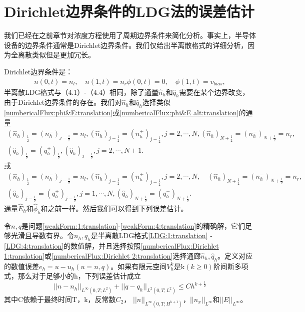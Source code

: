 \section{Dirichlet边界条件的LDG法的误差估计}
我们已经在之前章节对浓度方程使用了周期边界条件来简化分析。事实上，半导体设备的边界条件通常是Dirichlet边界条件。我们仅给出半离散格式的详细分析，因为全离散类似但是更加冗长。

Dirichlet边界条件是：
\begin{align}
    n(0,t) = n_l,\quad n(1,t) = n_r
    \phi(0,t) = 0, \quad \phi(1,t) = v_{bias},
\end{align}
半离散LDG格式与（4.1）-（4.4）相同，除了通量$\hat{n}_h$和$\hat{q}_h$需要在某个边界改变，由于Dirichlet边界条件的存在。我们对$\hat{n}_h$和$\hat{q}_h$选择类似\eqref{numbericalFlux:phi&E:translation}或\eqref{numbericalFlux:phi&E alt:translation}的通量
\begin{align}
    (\hat{n}_h)_{\frac{1}{2}} = (n_h^-)_{j-\frac{1}{2}} =n_l, (\hat{n}_h)_{j-\frac{1}{2}} =  (n_h^+)_{j-\frac{1}{2}},j=2,\cdots,N,  (\hat{n}_h)_{N+\frac{1}{2}} = (n_h^-)_{N+\frac{1}{2}} = n_r, \nonumber \\
    (\hat{q}_h)_{\frac{1}{2}} = (q_h^+)_{\frac{1}{2}}, (\hat{q}_h)_{j-\frac{1}{2}},j=2,\cdots,N+1. \label{numbericalFlux:Dirichlet 1:translation}
\end{align}
或
\begin{align}
    (\hat{n}_h)_{\frac{1}{2}} = (n_h^-)_{j-\frac{1}{2}} = n_l, (\hat{n}_h)_{j-\frac{1}{2}} = (n_h^+)_{j-\frac{1}{2}},j=2,\cdots,N,\quad (\hat{n}_h)_{N+\frac{1}{2}} = (n_h^-)_{N+\frac{1}{2}} = n_r, \nonumber \\
    (\hat{q}_h)_{j - \frac{1}{2}} = (q_h^+)_{j - \frac{1}{2}}, j = 1,\cdots,N,(\hat{q}_h)_{N+\frac{1}{2}} = (q_h^-)_{N+\frac{1}{2}}.\label{numbericalFlux:Dirichlet 2:translation}
\end{align}
通量$\hat{E}_h$和$\hat{\phi}_h$和之前一样。然后我们可以得到下列误差估计。
\begin{theorem}\label{theo:6.1:translation}
    令$n,q$是问题\eqref{weakForm:1:translation}-\eqref{weakForm:4:translation}的精确解，它们足够光滑且导数有界。令$n_h,q_h$是半离散LDG格式\eqref{LDG:1:translation} - \ref{LDG:4:translation}的数值解，并且选择按照\eqref{numbericalFlux:Dirichlet 1:translation}或\eqref{numbericalFlux:Dirichlet 2:translation}选择通廊$\hat{n}_h,\hat{q}_h$。定义对应的数值误差$e_h = u-u_h(u = n,q)$。如果有限元空间$V_h^k$是k$(k\geq  0)$阶间断多项式，那么对于足够小的h，下列误差估计成立
    \begin{equation}
        ||n-n_h||_{L^{\infty}(0,T;L^2)} + ||q - q_h||_{L^2(0,T;L^2)} \leq Ch^{k+\frac{1}{2}}
    \end{equation}
    其中C依赖于最终时间T，k，反常数$C_2$， $||n||_{L^{\infty}(0,T;H^{k+1})}$，$||n_x||_{L^{\infty}}$和$||E||_{L^{\infty}}$。
\end{theorem}
